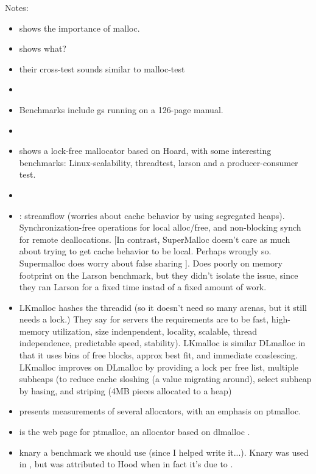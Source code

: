 \documentclass[pldi]{sigplanconf-pldi15}
\begin{document}
Notes: 
\begin{itemize}
\item \cite{ReinefeldDoSc13} shows the importance of malloc.
\item \cite{Dementiev09} shows what?
\item \cite{KukanovVo07} their cross-test sounds similar to malloc-test
\item \cite{Vyukov08} 
\item \cite{DetlefsDoZo94} Benchmarks include gs running on a 126-page manual.
\item \cite{HudsonSaAd06}
\item \cite{Michael04} shows a lock-free mallocator based on Hoard, with some interesting benchmarks: Linux-scalability, threadtest, larson and a producer-consumer test.
\item \cite{FengBe05}
\item \cite{SchneiderAnNi06}: streamflow (worries about cache behavior by using segregated heaps).  Synchronization-free operations for local alloc/free, and non-blocking synch for remote deallocations.  [In contrast, SuperMalloc doesn't care as much about trying to get cache behavior to be local.  Perhaps wrongly so.  Supermalloc does worry about false sharing  ].  Does poorly on memory footprint on the Larson benchmark, but they didn't isolate the issue, since they ran Larson for a fixed time instad of a fixed amount of work.
\item \cite{LarsonKr98} LKmalloc hashes the threadid (so it doesn't need so many arenas, but it still needs a lock.)  They say for servers the requirements are to be fast, high-memory utilization, size indenpendent, locality, scalable, thread independence, predictable speed, stability).  LKmalloc is similar DLmalloc in that it uses bins of free blocks, approx best fit, and immediate coaslescing.  LKmalloc improves on DLmalloc by providing a lock per free list, multiple subheaps (to reduce cache sloshing (a value migrating around), select subheap by hasing, and striping (4MB pieces allocated to a heap)
\item \cite{Gloger12} presents measurements of several allocators, with an emphasis on ptmalloc.
\item \cite{Gloger06} is the web page for ptmalloc, an allocator based on dlmalloc \cite{Lea96}.
\item knary a benchmark we should use (since I helped write
  it...).  Knary was used in \cite{SchneiderAnNi06}, but was
  attributed to Hood when in fact it's due to \cite{BlumofeJoKu96}.
\end{itemize}
\end{document}

